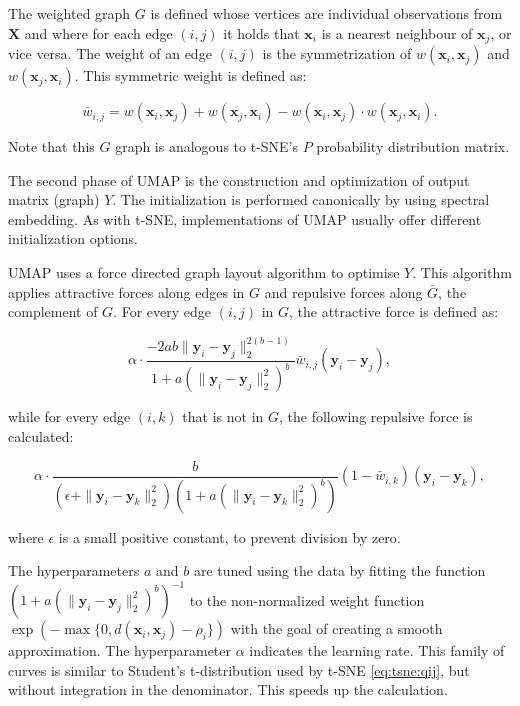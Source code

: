 The weighted graph $G$ is defined whose vertices are individual observations from $\mathbf{X}$ and where for each edge $(i, j)$ it holds that $\mathbf{x}_i$ is a nearest neighbour of $\mathbf{x}_j$, or vice versa. The weight of an edge $(i, j)$ is the symmetrization of $w(\mathbf{x}_i, \mathbf{x}_j)$ and $w(\mathbf{x}_j, \mathbf{x}_i)$. This symmetric weight is defined as:

\begin{equation}
	\bar{w}_{i,j} = w(\mathbf{x}_i,\mathbf{x}_j)+w(\mathbf{x}_j,\mathbf{x}_i)-w(\mathbf{x}_i,\mathbf{x}_j)\cdot w(\mathbf{x}_j,\mathbf{x}_i).
\end{equation}

Note that this $G$ graph is analogous to t-SNE's $P$ probability distribution matrix.

The second phase of UMAP is the construction and optimization of output matrix (graph) $Y$. The initialization is performed canonically by using spectral embedding. As with t-SNE, implementations of UMAP usually offer different initialization options.

UMAP uses a force directed graph layout algorithm to optimise $Y$. This algorithm applies attractive forces along edges in $G$ and repulsive forces along $\bar{G}$, the complement of $G$. For every edge $(i, j)$ in $G$, the attractive force is defined as:

\begin{equation}
	\alpha\cdot
	\frac{-2ab\|\mathbf{y}_i-\mathbf{y}_j\|_2^{2(b-1)}}{1+a\left(\|\mathbf{y}_i-\mathbf{y}_j\|_2^{2}\right)^b}
	\bar{w}_{i,j}(\mathbf{y}_i-\mathbf{y}_j),
\end{equation}

while for every edge $(i, k)$  that is not in $G$, the following repulsive force is calculated:

\begin{equation}
	\alpha\cdot
	\frac{b}{\left(\epsilon+\|\mathbf{y}_i-\mathbf{y}_k\|_2^2\right)\left(1+a\left(\|\mathbf{y}_i-\mathbf{y}_k\|_2^{2}\right)^b\right)}
	\left(1- \bar{w}_{i,k}\right)(\mathbf{y}_i-\mathbf{y}_k),
\end{equation}

where $\epsilon$ is a small positive constant, to prevent division by zero.

The hyperparameters $a$ and $b$ are tuned using the data by fitting the function $\left(1+a\left(\|\mathbf{y}_i-\mathbf{y}_j\|_2^{2}\right)^b\right)^{-1}$ to the non-normalized weight function $\exp\left({-\max\{0,d(\mathbf{x}_i, \mathbf{x}_j)-\rho_i\}}\right)$ with the goal of creating a smooth approximation. The hyperparameter $\alpha$ indicates the learning rate. This family of curves is similar to Student's t-distribution used by t-SNE \eqref{eq:tsne:qij}, but without integration in the denominator. This speeds up the calculation.

